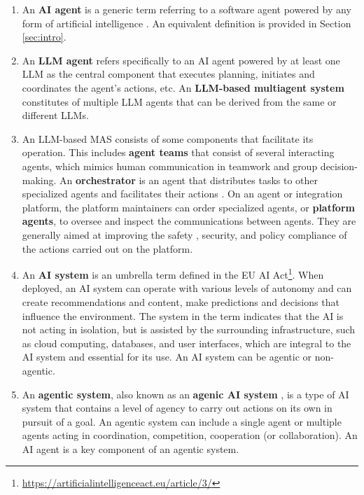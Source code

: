 \documentclass[11pt]{article}
\begin{document}
\begin{enumerate}[wide, labelindent=0pt, itemsep=0pt, topsep=1pt]
    \item[\textbullet] An \textbf{AI agent} is a generic term referring to a software agent powered by any form of artificial intelligence \citep{krishnan_ai_2025}. An equivalent definition is provided in Section \ref{sec:intro}.
    \item[\textbullet] An \textbf{LLM agent} refers specifically to an AI agent powered by at least one LLM as the central component that executes planning, initiates and coordinates the agent's actions, etc. An \textbf{LLM-based multiagent system} constitutes of multiple LLM agents that can be derived from the same or different LLMs.
    \item[\textbullet] An LLM-based MAS consists of some components that facilitate its operation. This includes \textbf{agent teams} that consist of several interacting agents, which mimics human communication in teamwork and group decision-making. An \textbf{orchestrator} is an agent that distributes tasks to other specialized agents and facilitates their actions \citep{bhatt_when_2025}. On an agent or integration platform, the platform maintainers can order specialized agents, or \textbf{platform agents}, to oversee and inspect \citep{hua_trustagent_2024} the communications between agents. They are generally aimed at improving the safety \citep{xiang_guardagent_2024}, security, and policy compliance of the actions carried out on the platform.
    \item[\textbullet] An \textbf{AI system} is an umbrella term defined in the EU AI Act\footnote{\url{https://artificialintelligenceact.eu/article/3/}}. When deployed, an AI system can operate with various levels of autonomy and can create recommendations and content, make predictions and decisions that influence the environment. The system in the term indicates that the AI is not acting in isolation, but is assisted by the surrounding infrastructure, such as cloud computing, databases, and user interfaces, which are integral to the AI system and essential for its use. An AI system can be agentic or non-agentic.
    \item[\textbullet] An \textbf{agentic system}, also known as an \textbf{agenic AI system} \cite{shavit_practices_2023}, is a type of AI system that contains a level of agency to carry out actions on its own in pursuit of a goal. An agentic system can include a single agent or multiple agents acting in coordination, competition, cooperation (or collaboration). An AI agent is a key component of an agentic system.

\end{enumerate}
\end{document}

